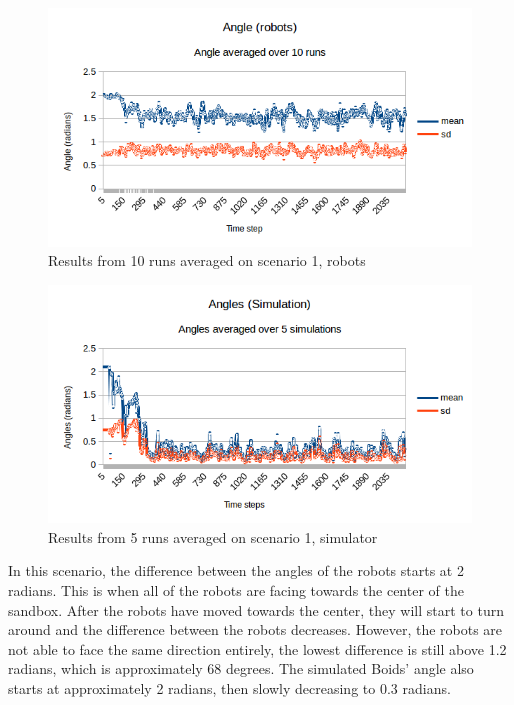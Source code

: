 \begin{figure}[h]
\begin{center}
\includegraphics[width=0.8\linewidth]{figs/runs/1pangle}
\end{center}
\caption[1. Angle, robots]{Results from 10 runs averaged on scenario 1, robots}
\label{fig:res1pang}
\end{figure}
\begin{figure}[h]
\begin{center}
\includegraphics[width=0.8\linewidth]{figs/runs/1sangle}
\end{center}
\caption[1. Angle, Simulation]{Results from 5 runs averaged on scenario 1, simulator}
\label{fig:res1sang}
\end{figure}

In this scenario, the difference between the angles of the robots starts at 2 radians. This is when all of the robots are facing towards the center of the sandbox. After the robots have moved towards the center, they will start to turn around and the difference between the robots decreases. However, the robots are not able to face the same direction entirely, the lowest difference is still above 1.2 radians, which is approximately 68 degrees. 
The simulated Boids' angle also starts at approximately 2 radians, then slowly decreasing to 0.3 radians. %


